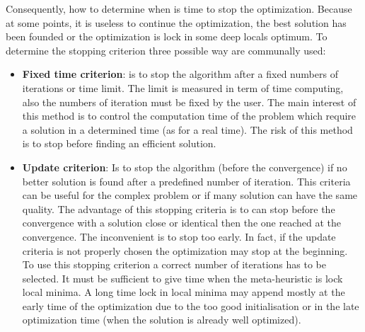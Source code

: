 Consequently, how to determine when is time to stop the optimization. Because at some points, it is useless to continue the optimization, the best solution has been founded or the optimization is lock in some deep locals optimum.%
 To determine the stopping criterion three possible way are communally used:\\
\begin{itemize}
\item  \textbf{Fixed time criterion}: is to stop the algorithm after a fixed numbers of iterations or time limit. The limit is measured in term of time computing, also the numbers of iteration must be fixed by the user. The main interest of this method is to control the computation time of the problem which require a solution in a determined time (as for a real time). The risk of this method is to stop before finding an efficient solution. \\

\item \textbf{Update criterion}: Is to stop the algorithm (before the convergence) if no better solution is found after a predefined number of iteration. This criteria can be useful for the complex problem or if many solution can have the same quality. 
The advantage of this stopping criteria is to can stop before the convergence with a solution close or identical then the one reached at the convergence. 
The inconvenient is to stop too early. In fact, if the update criteria is not properly chosen the optimization  may stop at the beginning.   \\
To use this stopping criterion a correct number of iterations has to  be selected. 
It must be sufficient to give time when the meta-heuristic is lock local minima. 
A long time lock in local minima may append mostly at the early time of the optimization due to the too good initialisation or in the late optimization time (when the solution is already well optimized).\\


\end{itemize}
